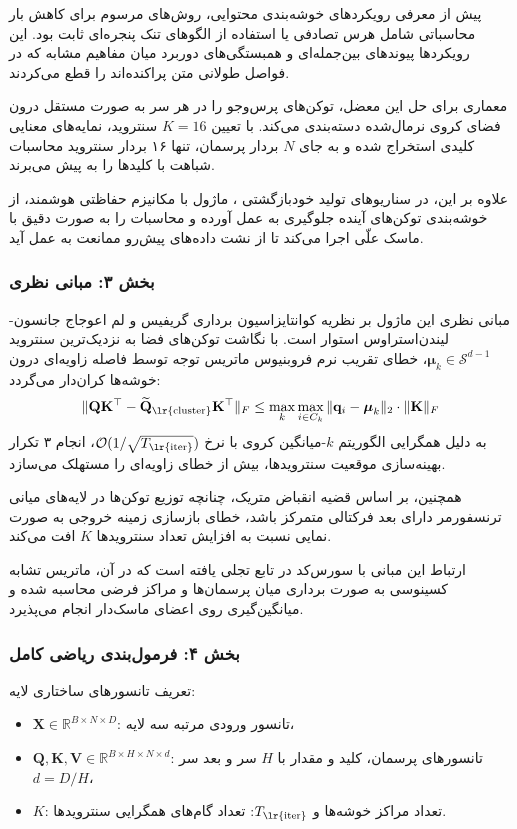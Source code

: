 پیش از معرفی رویکردهای خوشه‌بندی محتوایی، روش‌های مرسوم برای کاهش بار محاسباتی شامل هرس تصادفی یا استفاده از الگوهای تنک پنجره‌ای ثابت بود. این رویکردها پیوندهای بین‌جمله‌ای و همبستگی‌های دوربرد میان مفاهیم مشابه که در فواصل طولانی متن پراکنده‌اند را قطع می‌کردند.

معماری  برای حل این معضل، توکن‌های پرس‌وجو را در هر سر به صورت مستقل درون فضای کروی نرمال‌شده دسته‌بندی می‌کند. با تعیین $K=16$ سنتروید، نمایه‌های معنایی کلیدی استخراج شده و به جای $N$ بردار پرسمان، تنها ۱۶ بردار سنتروید محاسبات شباهت با کلیدها را به پیش می‌برند.

علاوه بر این، در سناریوهای تولید خودبازگشتی ، ماژول با مکانیزم حفاظتی هوشمند، از خوشه‌بندی توکن‌های آینده جلوگیری به عمل آورده و محاسبات را به صورت دقیق با ماسک علّی اجرا می‌کند تا از نشت داده‌های پیش‌رو ممانعت به عمل آید.

\subsubsection*{بخش ۳: مبانی نظری }
مبانی نظری این ماژول بر نظریه کوانتایزاسیون برداری گریفیس و لم اعوجاج جانسون-لیندن‌استراوس  استوار است. با نگاشت توکن‌های فضا به نزدیک‌ترین سنتروید $\boldsymbol{\mu}_k \in \mathcal{S}^{d-1}$، خطای تقریب نرم فروبنیوس ماتریس توجه توسط فاصله زاویه‌ای درون خوشه‌ها کران‌دار می‌گردد:
\begin{equation}
\|\mathbf{Q}\mathbf{K}^\top - \widetilde{\mathbf{Q}}_{\text{\lr{cluster}}}\mathbf{K}^\top\|_F \le \max_{k} \max_{i \in C_k} \|\mathbf{q}_i - \boldsymbol{\mu}_k\|_2 \cdot \|\mathbf{K}\|_F
\end{equation}
به دلیل همگرایی الگوریتم $k$-میانگین کروی با نرخ $\mathcal{O}(1/\sqrt{T_{\text{\lr{iter}}}})$، انجام ۳ تکرار بهینه‌سازی موقعیت سنترویدها، بیش از  خطای زاویه‌ای را مستهلک می‌سازد.

همچنین، بر اساس قضیه انقباض متریک، چنانچه توزیع توکن‌ها در لایه‌های میانی ترنسفورمر دارای بعد فرکتالی متمرکز باشد، خطای بازسازی زمینه خروجی به صورت نمایی نسبت به افزایش تعداد سنترویدها $K$ افت می‌کند.

ارتباط این مبانی با سورس‌کد در تابع  تجلی یافته است که در آن، ماتریس تشابه کسینوسی به صورت برداری میان پرسمان‌ها و مراکز فرضی محاسبه شده و میانگین‌گیری روی اعضای ماسک‌دار انجام می‌پذیرد.

\subsubsection*{بخش ۴: فرمول‌بندی ریاضی کامل }
تعریف تانسورهای ساختاری لایه:
\begin{itemize}
    \item $\mathbf{X} \in \mathbb{R}^{B \times N \times D}$: تانسور ورودی مرتبه سه لایه،
    \item $\mathbf{Q}, \mathbf{K}, \mathbf{V} \in \mathbb{R}^{B \times H \times N \times d}$: تانسورهای پرسمان، کلید و مقدار با $H$ سر و بعد سر $d=D/H$،
    \item $K$: تعداد مراکز خوشه‌ها و $T_{\text{\lr{iter}}}$: تعداد گام‌های همگرایی سنترویدها.
\end{itemize}

